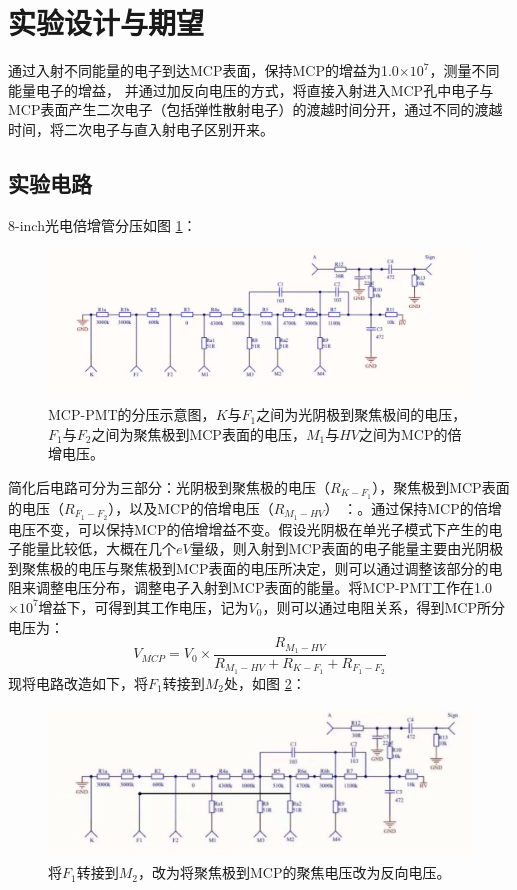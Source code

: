 \documentclass[a4paper]{article}
\begin{document}
\section{实验设计与期望}
通过入射不同能量的电子到达MCP表面，保持MCP的增益为1.0$\times 10^7$，测量不同能量电子的增益，
并通过加反向电压的方式，将直接入射进入MCP孔中电子与MCP表面产生二次电子（包括弹性散射电子）的渡越时间分开，通过不同的渡越时间，将二次电子与直入射电子区别开来。
\subsection{实验电路}
8-inch光电倍增管分压如图  \ref{fig:el}：
\begin{figure}[ht]
    \centering
    \includegraphics[height=4cm]{images/el.png}
    \caption{MCP-PMT的分压示意图，$K$与$F_1$之间为光阴极到聚焦极间的电压，$F_1$与$F_2$之间为聚焦极到MCP表面的电压，$M_1$与$HV$之间为MCP的倍增电压。}
    \label{fig:el}
\end{figure}
简化后电路可分为三部分：光阴极到聚焦极的电压（$R_{K-F_1}$），聚焦极到MCP表面的电压（$R_{F_1-F_2}$），以及MCP的倍增电压（$R_{M_1-HV}$） ：。通过保持MCP的倍增电压不变，可以保持MCP的倍增增益不变。假设光阴极在单光子模式下产生的电子能量比较低，大概在几个$eV$量级，则入射到MCP表面的电子能量主要由光阴极到聚焦极的电压与聚焦极到MCP表面的电压所决定，则可以通过调整该部分的电阻来调整电压分布，调整电子入射到MCP表面的能量。将MCP-PMT工作在1.0$\times 10^7$增益下，可得到其工作电压，记为$V_0$，则可以通过电阻关系，得到MCP所分电压为：
\begin{equation}
    V_{MCP}=V_0\times \frac{R_{M_1-HV}}{R_{M_1-HV}+R_{K-F_1}+R_{F_1-F_2}}
\end{equation}
现将电路改造如下，将$F_1$转接到$M_2$处，如图 \ref{fig:elg}：
\begin{figure}[ht]
    \centering
    \includegraphics[height=4cm]{images/elg.png}
    \caption{将$F_1$转接到$M_2$，改为将聚焦极到MCP的聚焦电压改为反向电压。}
    \label{fig:elg}
\end{figure}
\end{document}

